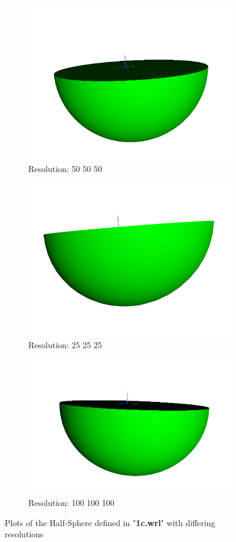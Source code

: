 \documentclass[acmlarge,nonacm=true]{acmart}
\begin{document}
\begin{figure}[H]
	\begin{subfigure}{.33\textwidth}
	  \centering
	  \includegraphics[width=.8\linewidth]{fig/1c50_50_50}
	  \caption{Resolution: 50 50 50}
	\end{subfigure}%
	\begin{subfigure}{.33\textwidth}
	  \centering
	  \includegraphics[width=.8\linewidth]{fig/1c25_25_25}
	  \caption{Resolution: 25 25 25}
	\end{subfigure}
	\begin{subfigure}{.33\textwidth}
		\centering
		\includegraphics[width=.8\linewidth]{fig/1c100_100_100}
		\caption{Resolution: 100 100 100}
	  \end{subfigure}
	\caption{Plots of the Half-Sphere defined in "\textbf{1c.wrl}" with differing resolutions}
	\label{fig:1c}
\end{figure}
\end{document}

